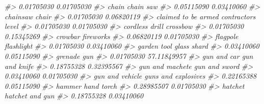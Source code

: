 \documentclass[
  12pt,
]{book}
\newenvironment{Shaded}{\begin{snugshade}}{\end{snugshade}}
\newcommand{\CommentTok}[1]{\textcolor[rgb]{0.37,0.37,0.37}{\textit{#1}}}
\begin{document}
\begin{Shaded}
\begin{Highlighting}[]
\CommentTok{\#\textgreater{}                       0.01705030                       0.01705030 }
\CommentTok{\#\textgreater{}                            chain                        chain saw }
\CommentTok{\#\textgreater{}                       0.05115090                       0.03410060 }
\CommentTok{\#\textgreater{}                         chainsaw                            chair }
\CommentTok{\#\textgreater{}                       0.01705030                       0.06820119 }
\CommentTok{\#\textgreater{}              claimed to be armed               contractor\textquotesingle{}s level }
\CommentTok{\#\textgreater{}                       0.01705030                       0.01705030 }
\CommentTok{\#\textgreater{}                   cordless drill                         crossbow }
\CommentTok{\#\textgreater{}                       0.01705030                       0.15345269 }
\CommentTok{\#\textgreater{}                          crowbar                        fireworks }
\CommentTok{\#\textgreater{}                       0.06820119                       0.01705030 }
\CommentTok{\#\textgreater{}                         flagpole                       flashlight }
\CommentTok{\#\textgreater{}                       0.01705030                       0.03410060 }
\CommentTok{\#\textgreater{}                      garden tool                      glass shard }
\CommentTok{\#\textgreater{}                       0.03410060                       0.05115090 }
\CommentTok{\#\textgreater{}                          grenade                              gun }
\CommentTok{\#\textgreater{}                       0.01705030                      57.11849957 }
\CommentTok{\#\textgreater{}                      gun and car                    gun and knife }
\CommentTok{\#\textgreater{}                       0.18755328                       0.32395567 }
\CommentTok{\#\textgreater{}                  gun and machete                    gun and sword }
\CommentTok{\#\textgreater{}                       0.03410060                       0.01705030 }
\CommentTok{\#\textgreater{}                  gun and vehicle              guns and explosives }
\CommentTok{\#\textgreater{}                       0.22165388                       0.05115090 }
\CommentTok{\#\textgreater{}                           hammer                       hand torch }
\CommentTok{\#\textgreater{}                       0.28985507                       0.01705030 }
\CommentTok{\#\textgreater{}                          hatchet                  hatchet and gun }
\CommentTok{\#\textgreater{}                       0.18755328                       0.03410060 }

\end{Highlighting}
\end{Shaded}
\end{document}
